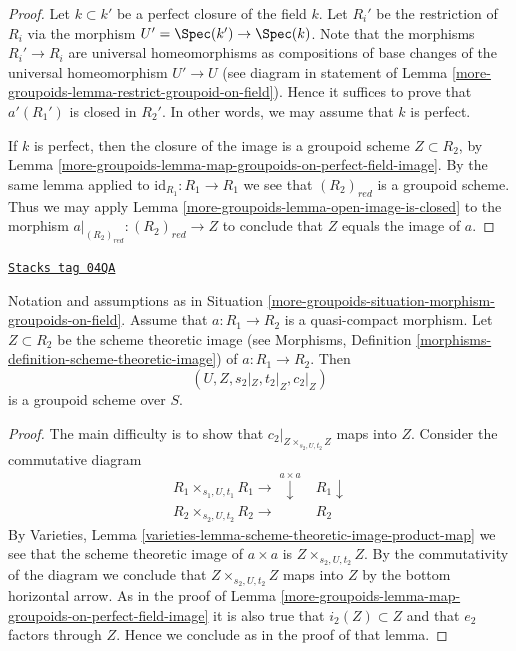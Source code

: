 \begin{proof}
Let $k \subset k'$ be a perfect closure of the field $k$.
Let $R_i'$ be the restriction of $R_i$ via the morphism
$U' = \Spec(k') \to \Spec(k)$. Note that the
morphisms $R_i' \to R_i$ are universal homeomorphisms as
compositions of base changes of the universal homeomorphism
$U' \to U$ (see diagram in statement of
Lemma \ref{more-groupoids-lemma-restrict-groupoid-on-field}).
Hence it suffices to prove that $a'(R_1')$ is closed
in $R_2'$. In other words, we may assume that $k$ is perfect.

\medskip\noindent
If $k$ is perfect, then the closure of the image is
a groupoid scheme $Z \subset R_2$, by
Lemma \ref{more-groupoids-lemma-map-groupoids-on-perfect-field-image}.
By the same lemma applied to
$\text{id}_{R_1} : R_1 \to R_1$
we see that $(R_2)_{red}$ is a groupoid scheme.
Thus we may apply
Lemma \ref{more-groupoids-lemma-open-image-is-closed}
to the morphism
$a|_{(R_2)_{red}} : (R_2)_{red} \to Z$
to conclude that $Z$ equals the image of $a$.
\end{proof}

\begin{lemma}
\label{more-groupoids-lemma-quasi-compact-map-groupoids-on-field-image}
\href{https://stacks.math.columbia.edu/tag/04QA}{\texttt{Stacks tag 04QA}}

Notation and assumptions as in
Situation \ref{more-groupoids-situation-morphism-groupoids-on-field}.
Assume that $a : R_1 \to R_2$ is a quasi-compact morphism.
Let $Z \subset R_2$ be the scheme theoretic image (see
Morphisms, Definition \ref{morphisms-definition-scheme-theoretic-image})
of $a : R_1 \to R_2$. Then
$$
(U, Z, s_2|_Z, t_2|_Z, c_2|_Z)
$$
is a groupoid scheme over $S$.
\end{lemma}

\begin{proof}
The main difficulty is to show that $c_2|_{Z \times_{s_2, U, t_2} Z}$
maps into $Z$. Consider the commutative diagram
$$
\begin{array}{cc}R_1 \times_{s_1, U, t_1} R_1 \longrightarrow\overset{a \times a}{\downarrow} & R_1 \downarrow \\ R_2 \times_{s_2, U, t_2} R_2 \longrightarrow & R_2\end{array}
$$
By
Varieties, Lemma \ref{varieties-lemma-scheme-theoretic-image-product-map}
we see that the scheme theoretic image of $a \times a$ is
$Z \times_{s_2, U, t_2} Z$. By the commutativity of the diagram we
conclude that $Z \times_{s_2, U, t_2} Z$ maps into $Z$ by the bottom
horizontal arrow. As in the proof of
Lemma \ref{more-groupoids-lemma-map-groupoids-on-perfect-field-image}
it is also true that $i_2(Z) \subset Z$ and that
$e_2$ factors through $Z$. Hence we conclude as in the
proof of that lemma.
\end{proof}

